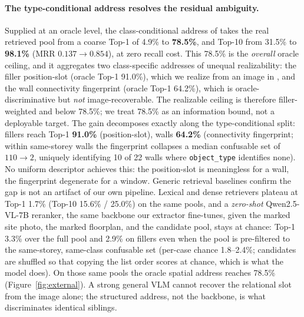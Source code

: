 \paragraph{The type-conditional address resolves the residual ambiguity.} Supplied at an oracle level, the class-conditional
address of  takes the real retrieved pool from a coarse Top-1 of 4.9\% to
\textbf{78.5\%}, and Top-10 from 31.5\% to \textbf{98.1\%} (MRR $0.137 \to 0.854$), at zero recall
cost. This 78.5\% is the \emph{overall} oracle ceiling, and it aggregates two class-specific
addresses of unequal realizability: the filler position-slot (oracle Top-1 91.0\%), which we
realize from an image in , and the wall connectivity fingerprint (oracle
Top-1 64.2\%), which is oracle-discriminative but \emph{not} image-recoverable. The realizable
ceiling is therefore filler-weighted and below 78.5\%; we treat 78.5\% as an information bound, not
a deployable target. The gain decomposes exactly along the type-conditional split: fillers reach Top-1
\textbf{91.0\%} (position-slot), walls \textbf{64.2\%} (connectivity fingerprint; within same-storey
walls the fingerprint collapses a median confusable set of $110 \to 2$, uniquely identifying 10 of 22
walls where \texttt{object\_type} identifies none). No uniform descriptor achieves this: the
position-slot is meaningless for a wall, the fingerprint degenerate for a window. Generic retrieval
baselines confirm the gap is not an artifact of our own pipeline. Lexical and dense retrievers plateau
at Top-1 1.7\% (Top-10 15.6\% / 25.0\%) on the same pools, and a \emph{zero-shot} Qwen2.5-VL-7B
reranker, the same backbone our extractor fine-tunes, given the marked site photo, the marked
floorplan, and the candidate pool, stays at chance: Top-1 3.3\% over the full pool and 2.9\% on
fillers even when the pool is pre-filtered to the same-storey, same-class confusable set
(per-case chance 1.8--2.4\%; candidates are shuffled so that copying the list order scores at chance,
which is what the model does). On those same pools the oracle spatial address reaches 78.5\%
(Figure~\ref{fig:external}). A strong general VLM cannot recover the relational slot from the image
alone; the structured address, not the backbone, is what discriminates identical siblings.

